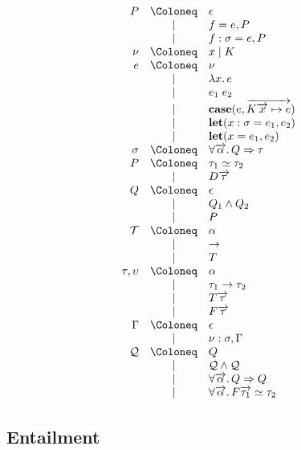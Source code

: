 \begin{align*}
  \begin{array}{rcl}
    P
    &\Coloneq &\epsilon \\
    &\mid &f = e, P \\
    &\mid &f: \sigma = e, P \\
    \nu &\Coloneq &x \mid K \\
    e
    &\Coloneq &\nu \\
    &\mid &\lambda x\ldotp e \\
    &\mid &e_1\; e_2 \\
    &\mid &\mathbf{case}(e, \overrightarrow{K\overrightarrow{x} \mapsto e}) \\
    &\mid &\mathbf{let}(x: \sigma = e_1, e_2) \\
    &\mid &\mathbf{let}(x = e_1, e_2) \\
    \sigma
    &\Coloneq &\forall \overrightarrow{\alpha}\ldotp Q \Rightarrow \tau \\
    P
    &\Coloneq &\tau_1 \simeq \tau_2 \\
    &\mid &D \overrightarrow{\tau} \\
    Q
    &\Coloneq &\epsilon \\
    &\mid &Q_1 \land Q_2 \\
    &\mid &P \\
    \mathcal{T}
    &\Coloneq &\alpha \\
    &\mid &\to \\
    &\mid &T \\
    \tau, \upsilon
    &\Coloneq &\alpha \\
    &\mid &\tau_1 \to \tau_2 \\
    &\mid &T \overrightarrow{\tau} \\
    &\mid &F \overrightarrow{\tau} \\
    \Gamma
    &\Coloneq &\epsilon \\
    &\mid &\nu: \sigma, \Gamma \\
    \mathcal{Q}
    &\Coloneq &Q \\
    &\mid &\mathcal{Q} \land \mathcal{Q} \\
    &\mid &\forall \overrightarrow{\alpha}\ldotp Q \Rightarrow Q \\
    &\mid &\forall \overrightarrow{\alpha}\ldotp F \overrightarrow{\tau_1} \simeq \tau_2
  \end{array}
\end{align*}

\subsection{Entailment}

